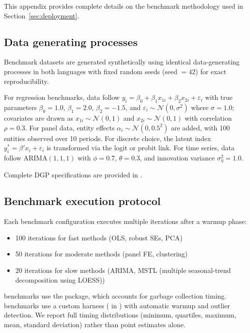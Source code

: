 This appendix provides complete details on the benchmark methodology used in
Section~\ref{sec:deployment}.

\subsection{Data generating processes}

Benchmark datasets are generated synthetically using identical data-generating
processes in both languages with fixed random seeds (seed $= 42$) for exact
reproducibility.

For regression benchmarks, data follow
$y_i = \beta_0 + \beta_1 x_{1i} + \beta_2 x_{2i} + \varepsilon_i$ with
true parameters $\beta_0 = 1.0$, $\beta_1 = 2.0$, $\beta_2 = -1.5$, and
$\varepsilon_i \sim \mathcal{N}(0, \sigma^2)$ where $\sigma = 1.0$; covariates
are drawn as $x_{1i} \sim \mathcal{N}(0, 1)$ and $x_{2i} \sim \mathcal{N}(0, 1)$
with correlation $\rho = 0.3$. For panel data, entity effects
$\alpha_i \sim \mathcal{N}(0, 0.5^2)$ are added, with 100 entities observed
over 10 periods. For discrete choice, the latent index
$y^*_i = \beta' x_i + \varepsilon_i$ is transformed via the logit or probit
link. For time series, data follow ARIMA$(1,1,1)$ with $\phi = 0.7$,
$\theta = 0.3$, and innovation variance $\sigma^2_\eta = 1.0$.

Complete DGP specifications are provided in
.

\subsection{Benchmark execution protocol}

Each benchmark configuration executes multiple iterations after a warmup phase:
\begin{itemize}
  \item 100 iterations for fast methods (OLS, robust SEs, PCA)
  \item 50 iterations for moderate methods (panel FE, clustering)
  \item 20 iterations for slow methods (ARIMA, MSTL (multiple seasonal-trend
    decomposition using LOESS))
\end{itemize}

 benchmarks use the  package, which accounts for garbage
collection timing.  benchmarks use a custom harness
( in ) with automatic warmup
and outlier detection. We report full timing distributions (minimum,
quartiles, maximum, mean, standard deviation) rather than point estimates alone.

